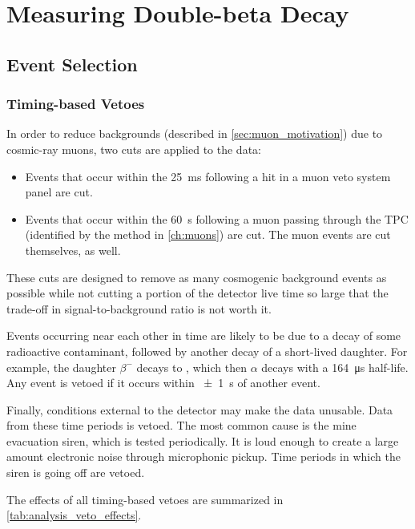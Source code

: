 \documentclass[herrin-thesis.tex]{subfiles}
\begin{document}
\chapter{Measuring Double-beta Decay}
\label{ch:analysis}

\section{Event Selection}
\subsection{Timing-based Vetoes}
In order to reduce backgrounds (described in \cref{sec:muon_motivation}) due to cosmic-ray muons, two cuts are applied to the data:
\begin{itemize}
\item Events that occur within the \SI{25}{\ms} following a hit in a muon veto system panel are cut.
\item Events that occur within the \SI{60}{\s} following a muon passing through the TPC (identified by the method in \cref{ch:muons}) are cut. The muon events are cut themselves, as well.
\end{itemize}
These cuts are designed to remove as many cosmogenic background events as possible while not cutting a portion of the detector live time so large that the trade-off in signal-to-background ratio is not worth it.

Events occurring near each other in time are likely to be due to a decay of some radioactive contaminant, followed by another decay of a short-lived daughter. For example, the  daughter  \(\beta^{-}\) decays to , which then \(\alpha\) decays with a \SI{164}{\micro\s} half-life.  Any event is vetoed if it occurs within \SI{\pm1}{\s} of another event.

Finally, conditions external to the detector may make the data unusable. Data from these time periods is vetoed. The most common cause is the mine evacuation siren, which is tested periodically. It is loud enough to create a large amount electronic noise through microphonic pickup. Time periods in which the siren is going off are vetoed.

The effects of all timing-based vetoes are summarized in \cref{tab:analysis_veto_effects}.
\end{document}
